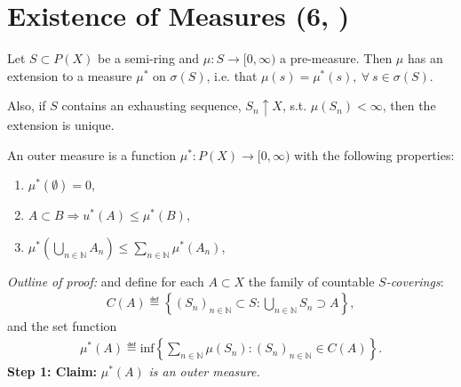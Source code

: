 \section{Existence of Measures \tiny{ (6, \cite{schilling2017measures})}}
\begin{theorem}[Carathéodory]
    Let \(S\subset P(X)\) be a semi-ring and \(\mu:S\rightarrow[0,\infty)\) a pre-measure. Then \(\mu\) has an extension to a measure \(\mu^{*}\)
    on \(\sigma(S)\), i.e. that \(\mu(s) = \mu^{*}(s), \ \forall \ s\in \sigma(S)\). 
    
    Also, if \(S\) contains an exhausting sequence, \(S_n\uparrow X\), s.t. \(\mu(S_n) < \infty\), then the extension is 
    unique.
\end{theorem}
\begin{definition}
    An outer measure is a function \(\mu^{*}: P(X) \rightarrow [0,\infty)\) with the following properties:
    \begin{enumerate}
        \item \(\mu^{*}(\emptyset) = 0\),
        \item \(A\subset B \Rightarrow u^{*}(A) \leq \mu^{*}(B)\),
        \item \(\mu^{*}\left( \bigcup\limits_{n\in\mathbb{N}} A_n \right)\leq \sum\limits_{n\in\mathbb{N}} \mu^{*}(A_n)\),
    \end{enumerate}
\end{definition}
\ifdetailed
\emph{Outline of proof:} 
and define for each \(A\subset X\) the family of countable \(S\)\emph{-coverings}:
\begin{align*}
    C(A) \eqdef \left\{(S_n)_{n\in\mathbb{N}} \subset S : \bigcup\limits_{n\in\mathbb{N}} S_n\supset A\right\},
\end{align*}
and the set function
\begin{align*}
    \mu^{*}(A) \eqdef \text{inf}\left\{ \sum\limits_{n\in\mathbb{N}} \mu(S_n): (S_n)_{n\in\mathbb{N}}\in C(A)\right\}.
\end{align*}
\textbf{Step 1: Claim: } \(\mu^{*}(A)\)\emph{ is an outer measure.}
